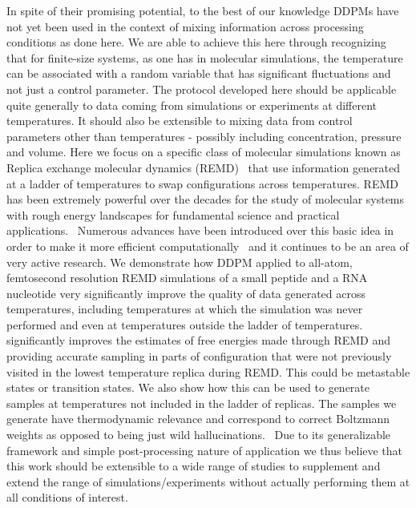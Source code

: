 In spite of their promising potential, to the best of our knowledge DDPMs have not yet been used in the context of mixing information across processing conditions as done here. We are able to achieve this here through recognizing that for finite-size systems, as one has in molecular simulations, the temperature can be associated with a random variable that has significant fluctuations and not just a control parameter. 
The protocol developed here should be applicable quite generally to data coming from simulations or experiments at different temperatures. It should also be extensible to mixing data from control parameters other than temperatures - possibly including concentration, pressure and volume. Here we focus on a specific class of molecular simulations known as Replica exchange molecular dynamics (REMD)~\cite{REMD,hansmann1997parallel} that use information generated at a ladder of temperatures to swap configurations across temperatures. REMD has been extremely powerful over the decades for the study of molecular systems with rough energy landscapes for fundamental science and practical applications.~\cite{abrams2014enhanced,abel2017advancing} Numerous advances have been introduced over this basic idea in order to make it more efficient computationally~\cite{REST,REST2,ballard2009replica,trebst2006optimized,nadler2007optimizing,kim2010generalized,chodera2011replica,gil2015enhanced} and it continues to be an area of very active research. We demonstrate how DDPM applied to all-atom, femtosecond resolution REMD simulations of a small peptide and a RNA nucleotide very significantly improve the quality of data generated across temperatures, including temperatures at which the simulation was never performed and even at temperatures outside the ladder of temperatures. significantly improves the estimates of free energies made through REMD and providing accurate sampling in parts of configuration that were not previously visited in the lowest temperature replica during REMD. This could be metastable states or transition states. We also show how this can be used to generate samples at temperatures not included in the ladder of replicas. The samples we generate have thermodynamic relevance and correspond to correct Boltzmann weights as opposed to being just wild hallucinations.~\cite{Ho2020DDPM,deep_learning_book} Due to its generalizable framework and simple post-processing nature of application we thus believe that this work should be extensible to a wide range of studies to supplement and extend the range of simulations/experiments without actually performing them at all conditions of interest.

